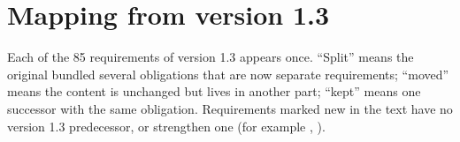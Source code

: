 \section{Mapping from version 1.3}\label{app:mapping}
Each of the 85 requirements of version 1.3 appears once. ``Split'' means the original bundled several obligations that are now separate requirements; ``moved'' means the content is unchanged but lives in another part; ``kept'' means one successor with the same obligation. Requirements marked new in the text have no version 1.3 predecessor, or strengthen one (for example , ).

